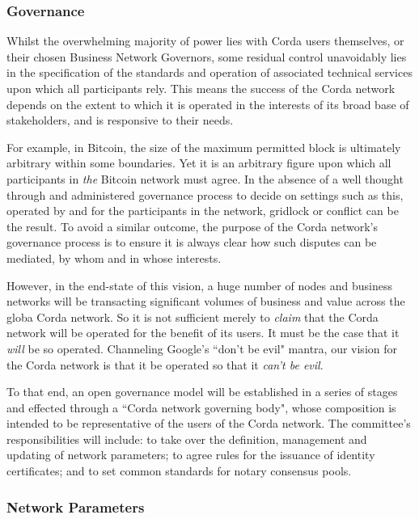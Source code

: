 \documentclass{article}
\begin{document}
\subsubsection{Governance}

Whilst the overwhelming majority of power lies with Corda users themselves, or their chosen Business Network Governors, some residual control unavoidably lies in the specification of the standards and operation of associated technical services upon which all participants rely. This means the success of the Corda network depends on the extent to which it is operated in the interests of its broad base of stakeholders, and is responsive to their needs.

For example, in Bitcoin, the size of the maximum permitted block is ultimately arbitrary within some boundaries. Yet it is an arbitrary figure upon which all participants in \textit{the} Bitcoin network must agree. In the absence of a well thought through and administered governance process to decide on settings such as this, operated by and for the participants in the network, gridlock or conflict can be the result. To avoid a similar outcome, the purpose of the Corda network's governance process is to ensure it is always clear how such disputes can be mediated, by whom and in whose interests.

However, in the end-state of this vision, a huge number of nodes and business networks will be transacting significant volumes of business and value across the globa Corda network. So it is not sufficient merely to \textit{claim} that the Corda network will be operated for the benefit of its users. It must be the case that it \textit{will} be so operated. Channeling Google's ``don't be evil" mantra, our vision for the Corda network is that it be operated so that it \textit{can't be evil}.

To that end, an open governance model will be established in a series of stages and effected through a ``Corda network governing body", whose composition is intended to be representative of the users of the Corda network. The committee's responsibilities will include: to take over the definition, management and updating of network parameters; to agree rules for the issuance of identity certificates; and to set common standards for notary consensus pools.

\subsubsection{Network Parameters}
\end{document}

